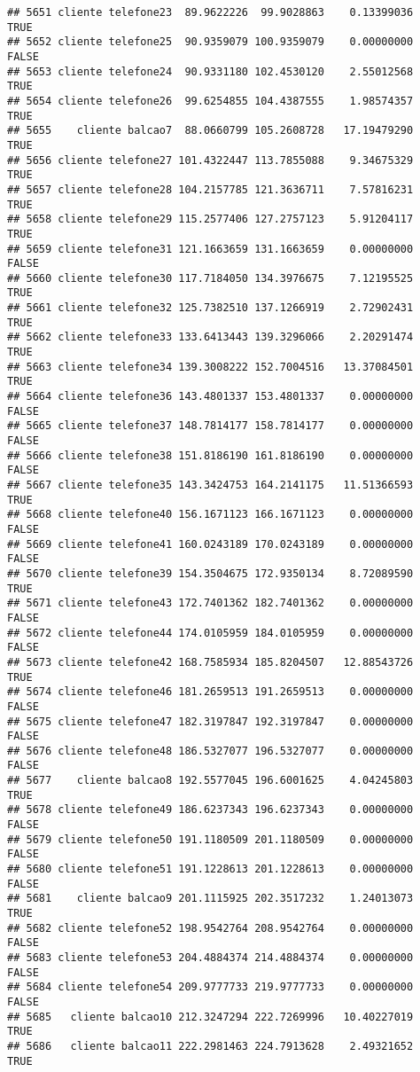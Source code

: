 \documentclass[
]{article}
\begin{document}
\begin{verbatim}
## 5651 cliente telefone23  89.9622226  99.9028863    0.13399036     TRUE
## 5652 cliente telefone25  90.9359079 100.9359079    0.00000000    FALSE
## 5653 cliente telefone24  90.9331180 102.4530120    2.55012568     TRUE
## 5654 cliente telefone26  99.6254855 104.4387555    1.98574357     TRUE
## 5655    cliente balcao7  88.0660799 105.2608728   17.19479290     TRUE
## 5656 cliente telefone27 101.4322447 113.7855088    9.34675329     TRUE
## 5657 cliente telefone28 104.2157785 121.3636711    7.57816231     TRUE
## 5658 cliente telefone29 115.2577406 127.2757123    5.91204117     TRUE
## 5659 cliente telefone31 121.1663659 131.1663659    0.00000000    FALSE
## 5660 cliente telefone30 117.7184050 134.3976675    7.12195525     TRUE
## 5661 cliente telefone32 125.7382510 137.1266919    2.72902431     TRUE
## 5662 cliente telefone33 133.6413443 139.3296066    2.20291474     TRUE
## 5663 cliente telefone34 139.3008222 152.7004516   13.37084501     TRUE
## 5664 cliente telefone36 143.4801337 153.4801337    0.00000000    FALSE
## 5665 cliente telefone37 148.7814177 158.7814177    0.00000000    FALSE
## 5666 cliente telefone38 151.8186190 161.8186190    0.00000000    FALSE
## 5667 cliente telefone35 143.3424753 164.2141175   11.51366593     TRUE
## 5668 cliente telefone40 156.1671123 166.1671123    0.00000000    FALSE
## 5669 cliente telefone41 160.0243189 170.0243189    0.00000000    FALSE
## 5670 cliente telefone39 154.3504675 172.9350134    8.72089590     TRUE
## 5671 cliente telefone43 172.7401362 182.7401362    0.00000000    FALSE
## 5672 cliente telefone44 174.0105959 184.0105959    0.00000000    FALSE
## 5673 cliente telefone42 168.7585934 185.8204507   12.88543726     TRUE
## 5674 cliente telefone46 181.2659513 191.2659513    0.00000000    FALSE
## 5675 cliente telefone47 182.3197847 192.3197847    0.00000000    FALSE
## 5676 cliente telefone48 186.5327077 196.5327077    0.00000000    FALSE
## 5677    cliente balcao8 192.5577045 196.6001625    4.04245803     TRUE
## 5678 cliente telefone49 186.6237343 196.6237343    0.00000000    FALSE
## 5679 cliente telefone50 191.1180509 201.1180509    0.00000000    FALSE
## 5680 cliente telefone51 191.1228613 201.1228613    0.00000000    FALSE
## 5681    cliente balcao9 201.1115925 202.3517232    1.24013073     TRUE
## 5682 cliente telefone52 198.9542764 208.9542764    0.00000000    FALSE
## 5683 cliente telefone53 204.4884374 214.4884374    0.00000000    FALSE
## 5684 cliente telefone54 209.9777733 219.9777733    0.00000000    FALSE
## 5685   cliente balcao10 212.3247294 222.7269996   10.40227019     TRUE
## 5686   cliente balcao11 222.2981463 224.7913628    2.49321652     TRUE

\end{verbatim}
\end{document}
